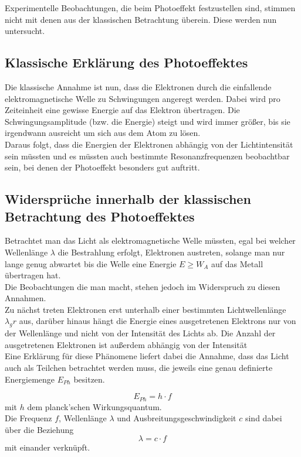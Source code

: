 Experimentelle Beobachtungen, die beim Photoeffekt festzustellen sind, stimmen nicht mit denen aus der klassischen Betrachtung überein. Diese werden nun untersucht.

\subsection{Klassische Erklärung des Photoeffektes}
 Die klassische Annahme ist nun, dass die Elektronen durch die einfallende elektromagnetische Welle zu Schwingungen angeregt werden. Dabei wird pro Zeiteinheit eine gewisse Energie auf das Elektron übertragen. Die Schwingungsamplitude (bzw. die Energie) steigt und wird immer größer, bis sie irgendwann ausreicht um sich aus dem Atom zu lösen.\\
Daraus folgt, dass die Energien der Elektronen abhängig von der Lichtintensität sein müssten und es müssten auch bestimmte Resonanzfrequenzen beobachtbar sein, bei denen der Photoeffekt besonders gut auftritt.

\subsection{Widersprüche innerhalb der klassischen Betrachtung des Photoeffektes}
Betrachtet man das Licht als elektromagnetische Welle müssten, egal bei welcher Wellenlänge $\lambda$ die Bestrahlung erfolgt, Elektronen austreten, solange man nur lange genug abwartet bis die Welle eine Energie $E \geq W_A$ auf das Metall übertragen hat.\\
Die Beobachtungen die man macht, stehen jedoch im Widerspruch zu diesen Annahmen.\\
Zu nächst treten Elektronen erst unterhalb einer bestimmten Lichtwellenlänge $\lambda_gr$ aus, darüber hinaus hängt die Energie eines ausgetretenen Elektrons nur von der Wellenlänge und nicht von der Intensität des Lichts ab. Die Anzahl der ausgetretenen Elektronen ist außerdem abhängig von der Intensität\\

Eine Erklärung für diese Phänomene liefert dabei die Annahme, dass das Licht auch als Teilchen betrachtet werden muss, die jeweils eine genau definierte Energiemenge $E_{Ph}$ besitzen.

\begin{equation}
E_{Ph} = h \cdot f
\end{equation}
mit $h$ dem planck'schen Wirkungsquantum.\\
Die Frequenz $f$, Wellenlänge $\lambda$ und Ausbreitungsgeschwindigkeit $c$ sind dabei über die Beziehung
\begin{equation}
\lambda = c \cdot f
\end{equation}
mit einander verknüpft.\\


